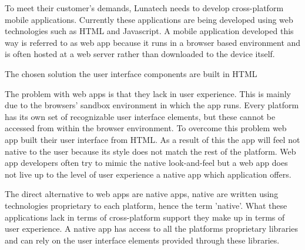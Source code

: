 

To meet their customer's demands, Lunatech needs to develop cross-platform mobile applications. Currently these applications are being developed using web technologies such as HTML and Javascript. A mobile application developed this way is referred to as web app because it runs in a browser based environment and is often hosted at a web server rather than downloaded to the device itself.


The chosen solution the user interface components are built in HTML


The problem with web apps is that they lack in user experience. This is mainly due to the browsers' sandbox environment in which the app runs. Every platform has its own set of recognizable user interface elements, but these cannot be accessed from within the browser environment. To overcome this problem web app built their user interface from HTML.  As a result of this the app will feel not native to the user because its style does not match the rest of the platform. Web app developers often try to mimic the native look-and-feel but a web app does not live up to the level of user experience a native app which application offers. 


The direct alternative to web apps are native apps, native are written using technologies proprietary to each platform, hence the term 'native'. What these applications lack in terms of cross-platform support they make up in terms of user experience.  A native app has access to all the platforms proprietary libraries and can rely on the user interface elements provided through these libraries.

